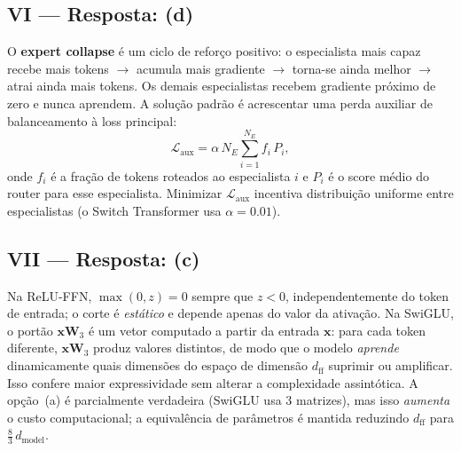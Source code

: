 \documentclass{dlproblemset}
\begin{document}
\subsection*{VI — Resposta: (d)}
O \textbf{expert collapse} é um ciclo de reforço positivo: o especialista mais
capaz recebe mais tokens $\to$ acumula mais gradiente $\to$ torna-se ainda melhor
$\to$ atrai ainda mais tokens. Os demais especialistas recebem gradiente próximo
de zero e nunca aprendem. A solução padrão é acrescentar uma perda auxiliar de
balanceamento à loss principal:
\[
  \mathcal{L}_{\text{aux}} = \alpha\, N_E \sum_{i=1}^{N_E} f_i\, P_i,
\]
onde $f_i$ é a fração de tokens roteados ao especialista $i$ e $P_i$ é o score
médio do router para esse especialista. Minimizar $\mathcal{L}_{\text{aux}}$
incentiva distribuição uniforme entre especialistas (o Switch Transformer usa $\alpha=0.01$).

\subsection*{VII — Resposta: (c)}
Na ReLU-FFN, $\max(0, z) = 0$ sempre que $z < 0$, independentemente do token
de entrada; o corte é \emph{estático} e depende apenas do valor da ativação.
Na SwiGLU, o portão $\mathbf{x}\mathbf{W}_3$ é um vetor computado a partir da entrada $\mathbf{x}$: para
cada token diferente, $\mathbf{x}\mathbf{W}_3$ produz valores distintos, de modo que o modelo
\emph{aprende} dinamicamente quais dimensões do espaço de dimensão $d_\text{ff}$
suprimir ou amplificar. Isso confere maior expressividade sem alterar a
complexidade assintótica. A opção~(a) é parcialmente verdadeira (SwiGLU usa 3
matrizes), mas isso \emph{aumenta} o custo computacional; a equivalência de
parâmetros é mantida reduzindo $d_\text{ff}$ para $\tfrac{8}{3}\,d_\text{model}$.

\end{document}
